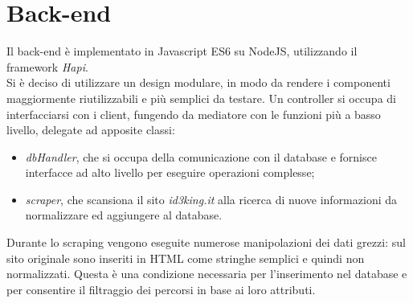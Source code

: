 \documentclass[11pt]{report}
\begin{document}
\section{Back-end}
Il back-end è implementato in Javascript ES6 su NodeJS, utilizzando il framework \textit{Hapi}.
\\Si è deciso di utilizzare un design modulare, in modo da rendere i componenti maggiormente riutilizzabili e più semplici da testare.
Un controller si occupa di interfacciarsi con i client, fungendo da mediatore con le funzioni più a basso livello, delegate ad apposite classi:
\begin{itemize}
	\item \textit{dbHandler}, che si occupa della comunicazione con il database e fornisce interfacce ad alto livello per eseguire operazioni complesse;
	\item \textit{scraper}, che scansiona il sito \textit{id3king.it} alla ricerca di nuove informazioni da normalizzare ed aggiungere al database.
\end{itemize}
Durante lo scraping vengono eseguite numerose manipolazioni dei dati grezzi: sul sito originale sono inseriti in HTML come stringhe semplici e quindi non normalizzati.
Questa è una condizione necessaria per l'inserimento nel database e per consentire il filtraggio dei percorsi in base ai loro attributi.
\end{document}
